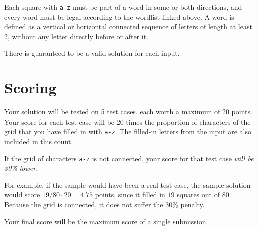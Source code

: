 Each square with \texttt{a-z} must be part of a word in some or both directions,
and every word must be legal according to the wordlist linked above.
A word is defined as a vertical or horizontal connected sequence of letters of length at least 2,
without any letter directly before or after it.

There is guaranteed to be a valid solution for each input.

\section*{Scoring}
Your solution will be tested on 5 test cases, each worth a maximum of 20 points.
Your score for each test case will be $20$ times the proportion of characters
of the grid that you have filled in with \texttt{a-z}.
The filled-in letters from the input are also included in this count.

If the grid of characters \texttt{a-z} is not connected, your score for that test case \emph{will be 30\% lower}.

For example, if the sample would have been a real test case, the sample solution
would score $19 / 80 \cdot 20 = 4.75$ points, since it filled in $19$ squares out of $80$.
Because the grid is connected, it does not suffer the 30\% penalty.

Your final score will be the maximum score of a single submission.
